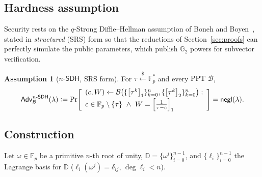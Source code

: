 \documentclass[version=submission]{iacrcc}
\theoremstyle{definition}
\newtheorem{assumption}{Assumption}[section]
\newcommand{\secpar}{\lambda}
\newcommand{\negl}{\mathsf{negl}}
\newcommand{\PPT}{\mathrm{PPT}}
\newcommand{\sample}{\xleftarrow{\;\$\;}}
\newcommand{\defeq}{\vcentcolon=}
\newcommand{\Adv}{\mathsf{Adv}}
\newcommand{\B}{\mathcal{B}}
\newcommand{\GG}{\mathbb{G}}
\newcommand{\FF}{\mathbb{F}}
\newcommand{\gone}[1]{\left[#1\right]_{1}}
\newcommand{\gtwo}[1]{\left[#1\right]_{2}}
\newcommand{\dom}{\mathbb{D}}
\newcommand{\lag}{\ell}
\newcommand{\nsdh}{n\text{-}\mathsf{SDH}}
\begin{document}
\subsection{Hardness assumption}

Security rests on the $q$-Strong Diffie--Hellman assumption of Boneh and Boyen~\cite{EC:BonBoy04a}, stated in
\emph{structured} (SRS) form so that the reductions of
Section~\ref{sec:proofs} can perfectly simulate the public parameters, which
publish $\GG_2$ powers for subvector verification.

\begin{assumption}[$\nsdh$, SRS form]\label{ass:nsdh}
For $\tau\sample\FF_p^{*}$ and every $\PPT$ $\B$,
\[
  \Adv^{\nsdh}_{\B}(\secpar)\defeq
  \Pr\!\left[
  \begin{array}{l}
    (c,W)\leftarrow\B\big(\{\gone{\tau^{k}}\}_{k=0}^{n},
                          \{\gtwo{\tau^{k}}\}_{k=0}^{n}\big):\\[2pt]
    c\in\FF_p\setminus\{\tau\}\ \wedge\ W=\gone{\tfrac{1}{\tau-c}}
  \end{array}
  \right]=\negl(\secpar).
\]
\end{assumption}

\subsection{Construction}

Let $\omega\in\FF_p$ be a primitive $n$-th root of unity,
$\dom=\{\omega^{i}\}_{i=0}^{n-1}$, and $\{\lag_i\}_{i=0}^{n-1}$ the Lagrange basis
for $\dom$ ($\lag_i(\omega^{j})=\delta_{ij}$, $\deg\lag_i<n$).
\end{document}

